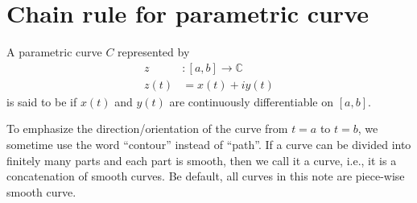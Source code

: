 
%




\section{Chain rule for parametric curve}


\begin{svgraybox}
	\begin{definition}
		A parametric curve $C$ represented by
		\begin{align*}
			z &: [a,b] \rightarrow \mathbb{C} \\
			z(t) &= x(t) + i y(t)
		\end{align*}
		is said to be  if
		$x(t)$ and $y(t)$ are continuously differentiable on $[a,b]$.
		
		\label{def:contour}
	\end{definition}
\end{svgraybox}

To emphasize the direction/orientation of the curve from $t=a$ to $t=b$, we sometime use the word ``contour'' instead of ``path''. If a curve can be divided into finitely many parts and each part is smooth, then we call it a   curve, i.e.,  it is  a concatenation of smooth curves. Be default, all curves in this note are piece-wise smooth curve. 

